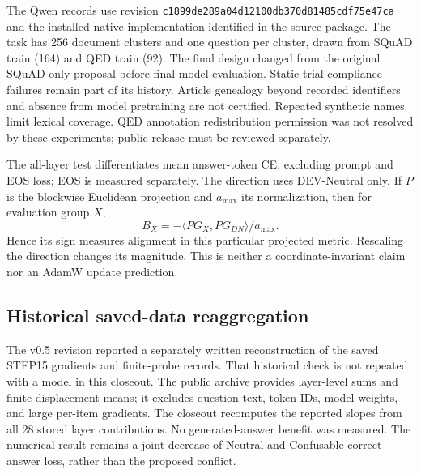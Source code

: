 \documentclass[10pt,a4paper]{article}
\begin{document}
The Qwen records use revision \texttt{c1899de289a04d12100db370d81485cdf75e47ca} and the installed native implementation identified in the source package. The task has 256 document clusters and one question per cluster, drawn from SQuAD train (164) and QED train (92). The final design changed from the original SQuAD-only proposal before final model evaluation. Static-trial compliance failures remain part of its history. Article genealogy beyond recorded identifiers and absence from model pretraining are not certified. Repeated synthetic names limit lexical coverage. QED annotation redistribution permission was not resolved by these experiments; public release must be reviewed separately.

The all-layer test differentiates mean answer-token CE, excluding prompt and EOS loss; EOS is measured separately. The direction uses DEV-Neutral only. If $P$ is the blockwise Euclidean projection and $a_{\max}$ its normalization, then for evaluation group $X$,
\[
B_X=-\langle PG_X,PG_{DN}\rangle/a_{\max}.
\]
Hence its sign measures alignment in this particular projected metric. Rescaling the direction changes its magnitude. This is neither a coordinate-invariant claim nor an AdamW update prediction.

\subsection{Historical saved-data reaggregation}
The v0.5 revision reported a separately written reconstruction of the saved
STEP15 gradients and finite-probe records. That historical check is not repeated
with a model in this closeout. The public archive provides layer-level sums and
finite-displacement means; it excludes question text, token IDs, model weights,
and large per-item gradients. The closeout recomputes the reported slopes from
all 28 stored layer contributions. No generated-answer benefit was measured.
The numerical result remains a joint decrease of Neutral and Confusable
correct-answer loss, rather than the proposed conflict.
\end{document}
